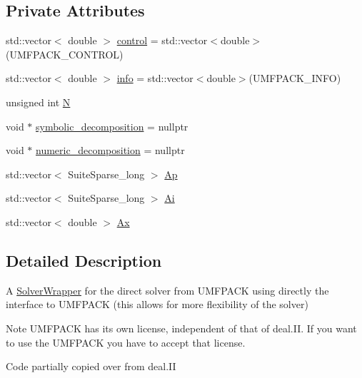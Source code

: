 \subsection*{Private Attributes}
\begin{DoxyCompactItemize}
\item 
std\+::vector$<$ double $>$ \hyperlink{class_block_solver_wrapper_u_m_f_p_a_c_k2_a295fca0b28991ae43c7bdfb72b5cdcb2}{control} = std\+::vector$<$double$>$(U\+M\+F\+P\+A\+C\+K\+\_\+\+C\+O\+N\+T\+R\+OL)
\item 
std\+::vector$<$ double $>$ \hyperlink{class_block_solver_wrapper_u_m_f_p_a_c_k2_a8dfbe8f5e1f1cf26460ba584b4eb02b6}{info} = std\+::vector$<$double$>$(U\+M\+F\+P\+A\+C\+K\+\_\+\+I\+N\+FO)
\item 
unsigned int \hyperlink{class_block_solver_wrapper_u_m_f_p_a_c_k2_a85d397826a36330bf3602d510acdd8d4}{N}
\item 
void $\ast$ \hyperlink{class_block_solver_wrapper_u_m_f_p_a_c_k2_a399387c1717404d92ed721fc31767f55}{symbolic\+\_\+decomposition} = nullptr
\item 
void $\ast$ \hyperlink{class_block_solver_wrapper_u_m_f_p_a_c_k2_ac3a439162324f36f5162439c075d02eb}{numeric\+\_\+decomposition} = nullptr
\item 
std\+::vector$<$ Suite\+Sparse\+\_\+long $>$ \hyperlink{class_block_solver_wrapper_u_m_f_p_a_c_k2_a18e53f152f97e51caab8dcf3efd5eaf1}{Ap}
\item 
std\+::vector$<$ Suite\+Sparse\+\_\+long $>$ \hyperlink{class_block_solver_wrapper_u_m_f_p_a_c_k2_a088fc386567b26c63b8d1a25a9319c75}{Ai}
\item 
std\+::vector$<$ double $>$ \hyperlink{class_block_solver_wrapper_u_m_f_p_a_c_k2_a57a4f7722dbbdd1ec2efa416f1cbb47c}{Ax}
\end{DoxyCompactItemize}


\subsection{Detailed Description}
A \hyperlink{class_solver_wrapper}{Solver\+Wrapper} for the direct solver from U\+M\+F\+P\+A\+CK using directly the interface to U\+M\+F\+P\+A\+CK (this allows for more flexibility of the solver)

\begin{DoxyNote}{Note}
U\+M\+F\+P\+A\+CK has its own license, independent of that of deal.\+II. If you want to use the U\+M\+F\+P\+A\+CK you have to accept that license.
\end{DoxyNote}
Code partially copied over from deal.\+II 

